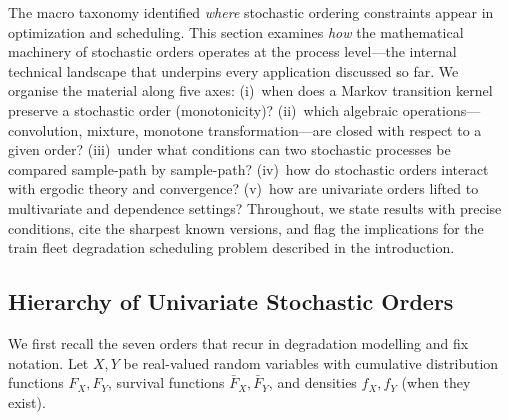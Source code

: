 \documentclass[11pt,a4paper]{article}
\theoremstyle{plain}
\theoremstyle{definition}
\theoremstyle{remark}
\begin{document}
The macro taxonomy identified \emph{where} stochastic ordering constraints appear in
optimization and scheduling.  This section examines \emph{how} the mathematical machinery
of stochastic orders operates at the process level---the internal technical landscape that
underpins every application discussed so far.  We organise the material along five axes:
(i)~when does a Markov transition kernel preserve a stochastic order (monotonicity)?
(ii)~which algebraic operations---convolution, mixture, monotone transformation---are
closed with respect to a given order? (iii)~under what conditions can two stochastic
processes be compared sample-path by sample-path? (iv)~how do stochastic orders interact
with ergodic theory and convergence? (v)~how are univariate orders lifted to multivariate
and dependence settings?  Throughout, we state results with precise conditions, cite the
sharpest known versions, and flag the implications for the train fleet degradation
scheduling problem described in the introduction.

\subsection{Hierarchy of Univariate Stochastic Orders}
\label{sec:micro:hierarchy}

We first recall the seven orders that recur in degradation modelling and fix notation.
Let $X, Y$ be real-valued random variables with cumulative distribution functions
$F_X, F_Y$, survival functions $\bar{F}_X, \bar{F}_Y$, and densities $f_X, f_Y$
(when they exist).

\end{document}
